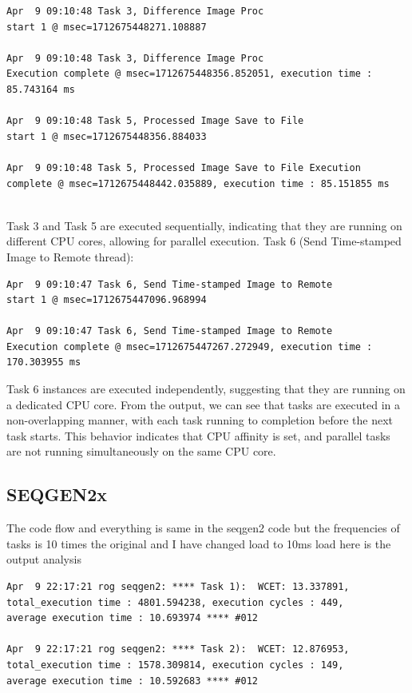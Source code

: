 \documentclass[a4paper,11pt]{article}%
\newenvironment{qanda}{\setlength{\parindent}{0pt}}{\bigskip}
\begin{document}
\begin{qanda}
\begin{enumerate}
			\begin{lstlisting}
Apr  9 09:10:48 Task 3, Difference Image Proc  
start 1 @ msec=1712675448271.108887

Apr  9 09:10:48 Task 3, Difference Image Proc 
Execution complete @ msec=1712675448356.852051, execution time : 85.743164 ms

Apr  9 09:10:48 Task 5, Processed Image Save to File 
start 1 @ msec=1712675448356.884033

Apr  9 09:10:48 Task 5, Processed Image Save to File Execution 
complete @ msec=1712675448442.035889, execution time : 85.151855 ms


			\end{lstlisting}
			Task 3 and Task 5 are executed sequentially, indicating that they are running on different CPU cores, allowing for parallel execution.
			Task 6 (Send Time-stamped Image to Remote thread):
			\begin{lstlisting}
Apr  9 09:10:47 Task 6, Send Time-stamped Image to Remote 
start 1 @ msec=1712675447096.968994

Apr  9 09:10:47 Task 6, Send Time-stamped Image to Remote 
Execution complete @ msec=1712675447267.272949, execution time : 170.303955 ms
\end{lstlisting}

			Task 6 instances are executed independently, suggesting that they are running on a dedicated CPU core.
			From the output, we can see that tasks are executed in a non-overlapping manner, with each task running to completion before the next task starts. This behavior indicates that CPU affinity is set, and parallel tasks are not running simultaneously on the same CPU core.

			\subsection{SEQGEN2x}

			The code flow and everything is same in the seqgen2 code but the frequencies of tasks is 10 times the original and I have changed load to 10ms load here is the output analysis

			\begin{lstlisting}
Apr  9 22:17:21 rog seqgen2: **** Task 1):  WCET: 13.337891, 
total_execution time : 4801.594238, execution cycles : 449, 
average execution time : 10.693974 **** #012 

Apr  9 22:17:21 rog seqgen2: **** Task 2):  WCET: 12.876953, 
total_execution time : 1578.309814, execution cycles : 149, 
average execution time : 10.592683 **** #012 


\end{lstlisting}
\end{enumerate}
\end{qanda}
\end{document}
